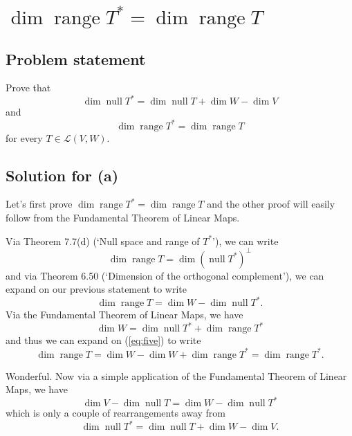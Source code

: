\documentclass{article}
\begin{document}
\clearpage

\section{$\operatorname{dim}\operatorname{range}T^*=\operatorname{dim}\operatorname{range}T$}
\subsection*{Problem statement}
Prove that
\[\operatorname{dim}\operatorname{null}T^*=\operatorname{dim}\operatorname{null}T+\operatorname{dim}W-\operatorname{dim}V\]
and
\[\operatorname{dim}\operatorname{range}T^*=\operatorname{dim}\operatorname{range}T\]
for every $T\in\mathcal{L}(V,W)$.

\subsection*{Solution for (a)}
Let's first prove $\operatorname{dim}\operatorname{range}T^*=\operatorname{dim}\operatorname{range}T$ and the other proof will easily follow from the Fundamental Theorem of Linear Maps.

Via Theorem 7.7(d) (`Null space and range of $T^*$'), we can write
\[\operatorname{dim}\operatorname{range}T=\operatorname{dim}(\operatorname{null}T^*)^\bot\]
and via Theorem 6.50 (`Dimension of the orthogonal complement'), we can expand on our previous statement to write
\begin{equation}\label{eq:five}
    \operatorname{dim}\operatorname{range}T=\operatorname{dim}W-\operatorname{dim}\operatorname{null}T^*.
\end{equation}
Via the Fundamental Theorem of Linear Maps, we have
\[\operatorname{dim}W=\operatorname{dim}\operatorname{null}T^*+\operatorname{dim}\operatorname{range}T^*\]
and thus we can expand on (\ref{eq:five}) to write
\[\operatorname{dim}\operatorname{range}T=\operatorname{dim}W-\operatorname{dim}W+\operatorname{dim}\operatorname{range}T^*=\operatorname{dim}\operatorname{range}T^*.\]

Wonderful. Now via a simple application of the Fundamental Theorem of Linear Maps, we have
\[\operatorname{dim}V-\operatorname{dim}\operatorname{null}T=\operatorname{dim}W-\operatorname{dim}\operatorname{null}T^*\]
which is only a couple of rearrangements away from 
\[\operatorname{dim}\operatorname{null}T^*=\operatorname{dim}\operatorname{null}T+\operatorname{dim}W-\operatorname{dim}V.\]

\clearpage
\end{document}
